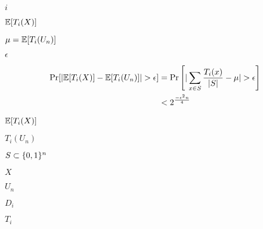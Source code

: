 \documentclass[10pt]{book}
\begin{document}
\begin{mdSnippets}
\begin{mdInlineSnippet}[865c0c0b4ab0e063e5caa3387c1a8741]
$i$\end{mdInlineSnippet}%
\begin{mdInlineSnippet}%
$\mathbb{E}[T_i(X)]$\end{mdInlineSnippet}%
\begin{mdInlineSnippet}%
$\mu = \mathbb{E}[T_i(U_n)]$\end{mdInlineSnippet}%
\begin{mdInlineSnippet}[92e4da341fe8f4cd46192f21b6ff3aa7]%
$\epsilon$\end{mdInlineSnippet}%
\begin{mdDisplaySnippet}[a3d4ef8321298a04334174e889f966d1]%
\[%
\begin{aligned}
\Pr[|\E[T_i(X)] - \E[T_i(U_n)]|  > \epsilon ] &= \Pr \left[ |\sum_{x \in S} \frac{T_i(x)}{|S|}  - \mu | > \epsilon \right]  \\
&< 2^{\frac{-\epsilon^2 n}{4}}
\end{aligned}
\]%
\end{mdDisplaySnippet}%
\begin{mdInlineSnippet}%
$\mathbb{E}[T_i(X)]$\end{mdInlineSnippet}%
\begin{mdInlineSnippet}[47dd8e1f4da059fc63f43df74c28a543]%
$T_i(U_n)$\end{mdInlineSnippet}%
\begin{mdInlineSnippet}[a5021131ab5a2e87f132dfdfa6f55df3]%
$S \subset \{0,1\}^n$\end{mdInlineSnippet}%
\begin{mdInlineSnippet}[02129bb861061d1a052c592e2dc6b383]%
$X$\end{mdInlineSnippet}%
\begin{mdInlineSnippet}%
$U_n$\end{mdInlineSnippet}%
\begin{mdInlineSnippet}[a1384aa3ea4e1d4ca4707ed950caee26]%
$D_i$\end{mdInlineSnippet}%
\begin{mdInlineSnippet}[475b78897f974bc7658f55655285a0ff]%
$T_i$\end{mdInlineSnippet}%
\begin{mdInlineSnippet}[02129bb861061d1a052c592e2dc6b383]%

\end{mdInlineSnippet}
\end{mdSnippets}
\end{document}
